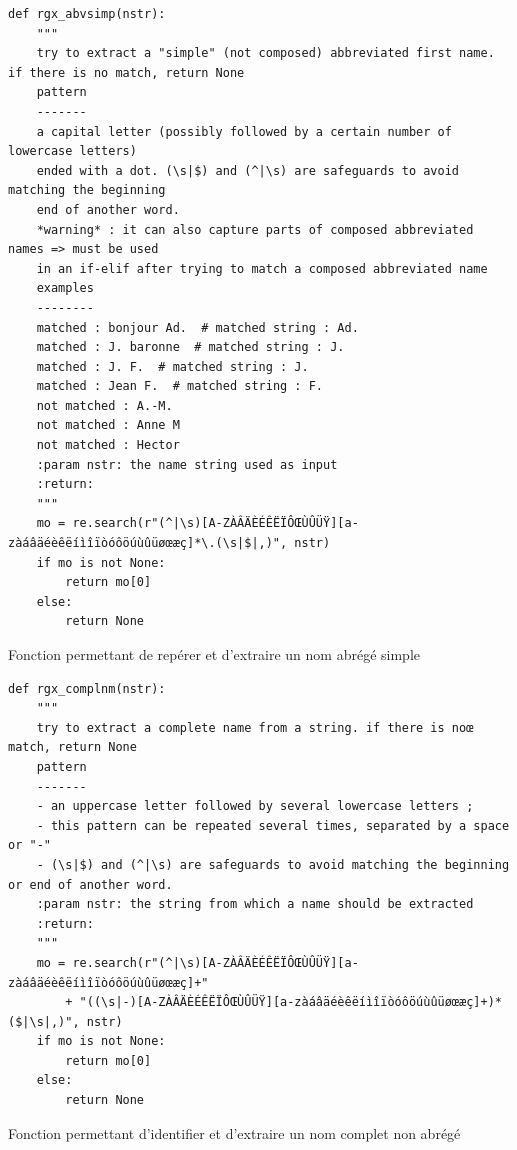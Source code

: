 \begin{listing}[p]
	\begin{verbatim}
def rgx_abvsimp(nstr):
	"""
	try to extract a "simple" (not composed) abbreviated first name. if there is no match, return None
	pattern
	-------
	a capital letter (possibly followed by a certain number of lowercase letters)
	ended with a dot. (\s|$) and (^|\s) are safeguards to avoid matching the beginning
	end of another word.
	*warning* : it can also capture parts of composed abbreviated names => must be used
	in an if-elif after trying to match a composed abbreviated name
	examples
	--------
	matched : bonjour Ad.  # matched string : Ad.
	matched : J. baronne  # matched string : J.
	matched : J. F.  # matched string : J.
	matched : Jean F.  # matched string : F.
	not matched : A.-M.
	not matched : Anne M
	not matched : Hector
	:param nstr: the name string used as input
	:return:
	"""
	mo = re.search(r"(^|\s)[A-ZÀÂÄÈÉÊËÏÔŒÙÛÜŸ][a-zàáâäéèêëíìîïòóôöúùûüøœæç]*\.(\s|$|,)", nstr)
	if mo is not None:
		return mo[0]
	else:
		return None
	\end{verbatim}
	\caption{Fonction permettant de repérer et d'extraire un nom abrégé simple}
	\label{appendix:rgxabvsimp}
\end{listing}

\begin{listing}[p]
	\begin{verbatim}
def rgx_complnm(nstr):
	"""
	try to extract a complete name from a string. if there is noœ match, return None
	pattern
	-------
	- an uppercase letter followed by several lowercase letters ;
	- this pattern can be repeated several times, separated by a space or "-"
	- (\s|$) and (^|\s) are safeguards to avoid matching the beginning or end of another word.
	:param nstr: the string from which a name should be extracted
	:return:
	"""
	mo = re.search(r"(^|\s)[A-ZÀÂÄÈÉÊËÏÔŒÙÛÜŸ][a-zàáâäéèêëíìîïòóôöúùûüøœæç]+"
		+ "((\s|-)[A-ZÀÂÄÈÉÊËÏÔŒÙÛÜŸ][a-zàáâäéèêëíìîïòóôöúùûüøœæç]+)*($|\s|,)", nstr)
	if mo is not None:
		return mo[0]
	else:
		return None
	\end{verbatim}
	\caption{Fonction permettant d'identifier et d'extraire un nom complet non abrégé}
	\label{appendix:rgxfull}
\end{listing}
\pagebreak

